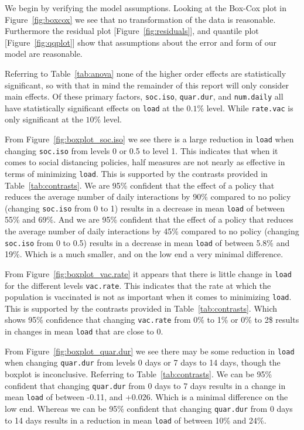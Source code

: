 \documentclass[12pt,a4paper]{article}
\begin{document}
We begin by verifying the model assumptions. Looking at the Box-Cox plot in Figure~\ref{fig:boxcox} we see that no transformation of the data is reasonable. Furthermore the  residual plot [Figure~\ref{fig:residuals}], and quantile plot [Figure~\ref{fig:qqplot}] show that assumptions about the error and form of our model are reasonable.

Referring to Table~\ref{tab:anova} none of the higher order effects are statistically significant, so with that in mind the remainder of this report will only consider main effects. Of these primary factors, \verb`soc.iso`, \verb`quar.dur`, and \verb`num.daily` all have statistically significant effects on \verb`load` at the $0.1\%$ level. While \verb`rate.vac` is only significant at the $10\%$ level.

From Figure~\ref{fig:boxplot_soc.iso} we see there is a large reduction in \verb`load` when changing \verb`soc.iso` from levels 0 or 0.5 to level 1. This indicates that when it comes to social distancing policies, half measures are not nearly as effective in terms of minimizing \verb`load`. This is supported by the contrasts provided in Table~\ref{tab:contrasts}. We are 95\% confident that the effect of a policy that reduces the average number of daily interactions by 90\% compared to no policy (changing \verb`soc.iso` from 0 to 1) results in a decrease in mean \verb`load` of between 55\% and 69\%. And we are 95\% confident that the effect of a policy that reduces the average number of daily interactions by 45\% compared to no policy (changing \verb`soc.iso` from 0 to 0.5) results in a decrease in mean \verb`load` of between 5.8\% and 19\%. Which is a much smaller, and on the low end a very minimal difference.

From Figure~\ref{fig:boxplot_vac.rate} it appears that there is little change in \verb`load` for the different levels \verb`vac.rate`. This indicates that the rate at which the population is vaccinated is not as important when it comes to minimizing \verb`load`. This is supported by the contrasts provided in Table~\ref{tab:contrasts}. Which shows 95\% confidence that changing \verb`vac.rate` from 0\% to 1\% or 0\% to 2\$ results in changes in mean \verb`load` that are close to 0.

From Figure~\ref{fig:boxplot_quar.dur} we see there may be some reduction in \verb`load` when changing \verb`quar.dur` from levels 0 days or 7 days to 14 days, though the boxplot is inconclusive. Referring to Table~\ref{tab:contrasts}. We can be 95\% confident that changing \verb`quar.dur` from 0 days to 7 days results in a change in mean \verb`load` of between -0.11, and +0.026. Which is a minimal difference on the low end. Whereas we can be 95\% confident that changing \verb`quar.dur` from 0 days to 14 days results in a reduction in mean \verb`load` of between 10\% and 24\%. 
\end{document}
